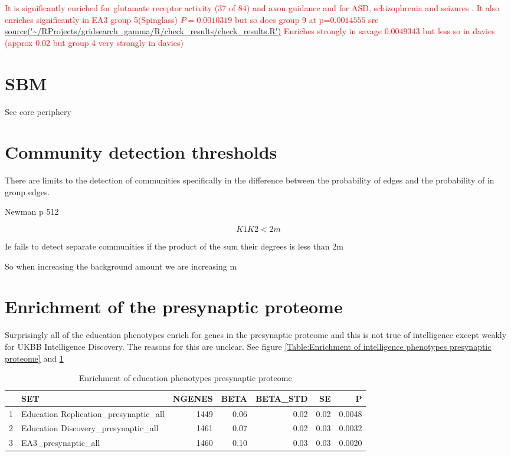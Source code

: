 \textcolor{red}{It is significantly enriched for glutamate receptor activity (37 of 84) and axon guidance and for ASD, schizophrenia and seizures . It also enriches significantly in EA3 group 5(Spinglass) $P=0.0010319$ but so does group 9 at p=$0.0014555$ src \url{source('~/RProjects/gridsearch_gamma/R/check_results/check_results.R')}
Enriches strongly in savage $0.0049343$ but less so in davies (approx 0.02 but group 4 very strongly in davies)}

\section{SBM}
See core periphery

 \section{Community detection thresholds}
There are limits to the detection of communities specifically in the difference between the probability of edges and the probability of in group edges.

Newman p 512

\begin{equation}
    K1K2 < 2m
\end{equation}

Ie fails to detect separate communities if the product of the sum their degrees is less than 2m

So when increasing the background amount we are increasing m

 
 \section{Enrichment of the presynaptic proteome}
 
 Surprisingly all of the education phenotypes enrich for genes in the presynaptic proteome and this is not true of intelligence except weakly for UKBB Intelligence Discovery. The reasons for this are unclear. See figure \ref{Table:Enrichment of intelligence phenotypes presynaptic proteome} and \ref{Table:Enrichment of education phenotypes presynaptic proteome}
 


\begin{table}
\centering
\begin{tabular}{rlrrrrr}
  \hline
 & SET & NGENES & BETA & BETA\_STD & SE & P \\ 
  \hline
1 & Education Replication\_presynaptic\_all & 1449 & 0.06 & 0.02 & 0.02 & 0.0048 \\ 
  2 & Education Discovery\_presynaptic\_all & 1461 & 0.07 & 0.02 & 0.03 & 0.0032 \\ 
  3 & EA3\_presynaptic\_all & 1460 & 0.10 & 0.03 & 0.03 & 0.0020 \\ 
   \hline
\end{tabular}
\caption{Enrichment of education phenotypes presynaptic proteome} 
\label{Table:Enrichment of education phenotypes presynaptic proteome}
\end{table}




